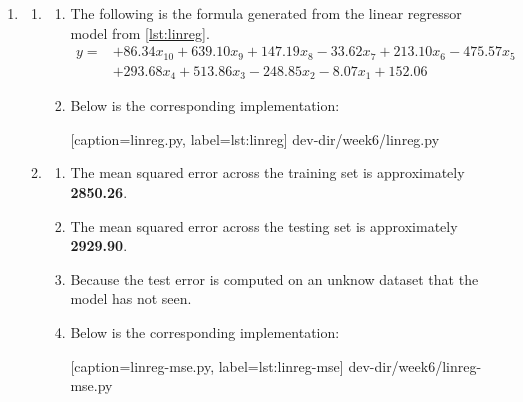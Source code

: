 \documentclass{article}
\begin{document}
\begin{enumerate}[leftmargin={*}, font={\bf}, label={\arabic*.}, ref={\arabic*}]
  \item \label{qst:1}
    \begin{enumerate}[label={(\Alph*)}, ref={\theenumi(\Alph*)}]
      \item \label{qst:1A}
        \begin{enumerate}[label={(\roman*)}, ref={\theenumii(\roman*)}]
          \item
            The following is the formula generated from the linear regressor model
            from \autoref{lst:linreg}.
            \begin{align*}
              y = &+86.34x_{10} + 639.10x_9 + 147.19x_8 - 33.62x_7 + 213.10x_6 - 475.57x_5 \\
                  &+293.68x_4 + 513.86x_3 - 248.85x_2 - 8.07x_1 + 152.06
            \end{align*}
          
          \item
            Below is the corresponding implementation:
            
              [caption={\sf linreg.py}, label={lst:linreg}]
              {dev-dir/week6/linreg.py}
        \end{enumerate}

      \item \label{qst:1B}
        \begin{enumerate}[label={(\roman*)}, ref={\theenumii(\roman*)}]
          \item
            The mean squared error across the training set is approximately {\bf
            2850.26}.
          
          \item
            The mean squared error across the testing set is approximately {\bf
            2929.90}.
            
          \item
            Because the test error is computed on an unknow dataset that the model
            has not seen.
            
          \item
            Below is the corresponding implementation:
            
              [caption={\sf linreg-mse.py}, label={lst:linreg-mse}]
              {dev-dir/week6/linreg-mse.py}
        \end{enumerate}


\end{enumerate}
\end{enumerate}
\end{document}
